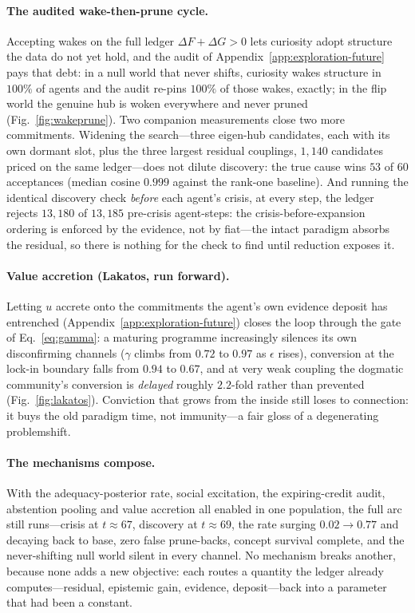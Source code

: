 \documentclass[runningheads]{llncs}
\begin{document}
\paragraph{The audited wake-then-prune cycle.}
Accepting wakes on the full ledger $\Delta F + \Delta G > 0$ lets curiosity adopt structure the
data do not yet hold, and the audit of Appendix~\ref{app:exploration-future} pays that debt: in a
null world that never shifts, curiosity wakes structure in $100\%$ of agents and the audit
re-pins $100\%$ of those wakes, exactly; in the flip world the genuine hub is woken everywhere
and never pruned (Fig.~\ref{fig:wakeprune}). Two companion measurements close two more
commitments. Widening the search---three eigen-hub candidates, each with its own dormant slot,
plus the three largest residual couplings, $1{,}140$ candidates priced on the same ledger---does
not dilute discovery: the true cause wins $53$ of $60$ acceptances (median cosine $0.999$ against
the rank-one baseline). And running the identical discovery check \emph{before} each agent's
crisis, at every step, the ledger rejects $13{,}180$ of $13{,}185$ pre-crisis agent-steps: the
crisis-before-expansion ordering is enforced by the evidence, not by fiat---the intact paradigm
absorbs the residual, so there is nothing for the check to find until reduction exposes it.

\paragraph{Value accretion (Lakatos, run forward).}
Letting $u$ accrete onto the commitments the agent's own evidence deposit has entrenched
(Appendix~\ref{app:exploration-future}) closes the loop through the gate of
Eq.~\eqref{eq:gamma}: a maturing programme increasingly silences its own disconfirming channels
($\gamma$ climbs from $0.72$ to $0.97$ as $\epsilon$ rises), conversion at the lock-in boundary
falls from $0.94$ to $0.67$, and at very weak coupling the dogmatic community's conversion is
\emph{delayed} roughly $2.2$-fold rather than prevented (Fig.~\ref{fig:lakatos}). Conviction that
grows from the inside still loses to connection: it buys the old paradigm time, not immunity---a
fair gloss of a degenerating problemshift.

\paragraph{The mechanisms compose.}
With the adequacy-posterior rate, social excitation, the expiring-credit audit, abstention
pooling and value accretion all enabled in one population, the full arc still runs---crisis at
$t\approx67$, discovery at $t\approx69$, the rate surging $0.02\to0.77$ and decaying back to
base, zero false prune-backs, concept survival complete, and the never-shifting null world silent
in every channel. No mechanism breaks another, because none adds a new objective: each routes a
quantity the ledger already computes---residual, epistemic gain, evidence, deposit---back into a
parameter that had been a constant.
\end{document}
